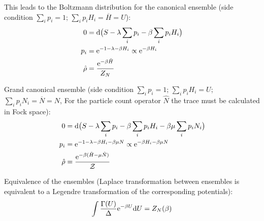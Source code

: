 			\noindent
			This leads to the Boltzmann distribution for the canonical ensemble (side condition $\sum_i p_i = 1$; $\sum_i p_i H_i = \overline{H} = U$):
			\begin{equation}
				\begin{aligned}
					0 &= \dd \big( S - \lambda \sum_i p_i - \beta \sum_i p_i H_i \big) \\
					p_i &= \mathrm{e}^{-1-\lambda-\beta H_i} \propto \mathrm{e}^{-\beta H_i} \\
					\hat{\rho} &= \frac{\mathrm{e}^{-\beta \hat{H}}}{Z_N} \\
				\end{aligned}
			\end{equation}

			\noindent
			Grand canonical ensemble (side condition $\sum_i p_i = 1$; $\sum_i p_i H_i = U$; $\sum_i p_i N_i = \overline{N} = N$, For the particle count operator $\hat{N}$ the trace must be calculated in Fock space):
			\begin{equation}
				\begin{aligned}
					0 &= \dd \big( S - \lambda \sum_i p_i - \beta \sum_i p_i H_i - \beta\mu \sum_i p_i N_i \big) \\
					p_i &= \mathrm{e}^{-1-\lambda-\beta H_i-\beta\mu N} \propto \mathrm{e}^{-\beta H_i - \beta\mu N} \\
					\hat{\rho} &= \frac{\mathrm{e}^{-\beta (\hat{H} - \mu \hat{N})}}{\mathcal{Z}} \\
				\end{aligned}
			\end{equation}

			\noindent
			Equivalence of the ensembles (Laplace transformation between ensembles is equivalent to a Legendre transformation of the corresponding potentials):
			\begin{equation}
				\int \frac{\Gamma(U)}{\Delta} \mathrm{e}^{-\beta U} \dd U = Z_N(\beta)
			\end{equation}



